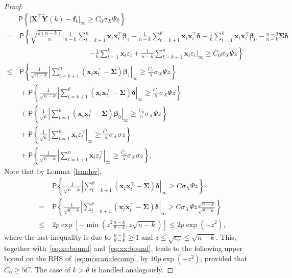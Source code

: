 \documentclass[11pt, a4paper]{article}
\newcommand{\mbf}{\mathbf}
\newcommand{\eps}{\epsilon}
\newcommand{\vep}{\varepsilon}
\renewcommand{\l}{\left}
\renewcommand{\r}{\right}
\def\wt{\widetilde}
\newcommand{\cp}{\theta}
\newcommand{\p}{\mathsf{P}}
\newcommand{\nn}{\nonumber}
\theoremstyle{definition}
\theoremstyle{definition}
\theoremstyle{definition}
\theoremstyle{definition}
\theoremstyle{definition}
\theoremstyle{remark}
\theoremstyle{definition}
\theoremstyle{definition}
\theoremstyle{definition}
\begin{document}
\begin{proof}
\begin{align}
& \p\l\{ \vert \mbf X^\top \wt{\mbf Y}(k) - \bar{\mbf f}_k \vert_\infty \ge \bar{C}_0 \sigma_X \Psi z \r\}
\nn \\
= & \, \p\l\{ \sqrt{\frac{k(n - k)}{n}} \Biggl\vert \frac{1}{n - k} \sum_{t = k + 1}^n \mbf x_t \mbf x_t^\top \bm\beta_1  - \frac{1}{n - k} \sum_{t = k + 1}^{\cp} \mbf x_t \mbf x_t^\top \bm\delta - \frac{1}{k} \sum_{t = 1}^k \mbf x_t \mbf x_t^\top \bm\beta_0 - \frac{n - \cp}{n - k} \bm\Sigma \bm\delta \r.
\nn \\
& \qquad \qquad \qquad \qquad \qquad \l. - \frac{1}{k} \sum_{t = 1}^k \mbf x_t \vep_t + \frac{1}{n - k} \sum_{t = k + 1}^n \mbf x_t \vep_t \Biggr\vert_\infty  \ge \bar{C}_0 \sigma_X \Psi z \r\}
\nn \\
\le & \, \p\l\{ \frac{1}{\sqrt{n - k}} \l\vert \sum_{t = k + 1}^n (\mbf x_t \mbf x_t^\top - \bm\Sigma) \bm\beta_1 \r\vert_\infty \ge \frac{\bar{C}_0}{5} \sigma_X \Psi z \r\}
\nn \\
& \, + \p\l\{ \frac{1}{\sqrt{n - k}} \l\vert \sum_{t = k + 1}^\cp (\mbf x_t \mbf x_t^\top - \bm\Sigma) \bm\delta \r\vert_\infty \ge \frac{\bar{C}_0}{5} \sigma_X \Psi z \r\}
\nn \\
& \, + \p\l\{ \frac{1}{\sqrt{k}} \l\vert \sum_{t = 1}^k (\mbf x_t \mbf x_t^\top - \bm\Sigma) \bm\beta_0 \r\vert_\infty \ge \frac{\bar{C}_0}{5} \sigma_X \Psi z \r\}
\nn \\
& \, + \p\l\{ \frac{1}{\sqrt{k}} \l\vert \sum_{t = 1}^k \mbf x_t \vep_t^\top \r\vert_\infty \ge \frac{\bar{C}_0}{5} \sigma_X \sigma z \r\} 
\nn \\
& \, + \p\l\{ \frac{1}{\sqrt{n - k}} \l\vert \sum_{t = k + 1}^n \mbf x_t \vep_t^\top \r\vert_\infty \ge \frac{\bar{C}_0}{5} \sigma_X \sigma z \r\}.
\label{eq:mcscan:decomp}
\end{align}
Note that by Lemma~\ref{lem:hw},
\begin{align*}
& \p\l\{ \frac{1}{\sqrt{n - k}} \l\vert \sum_{t = k + 1}^\cp (\mbf x_t \mbf x_t^\top - \bm\Sigma) \bm\delta \r\vert_\infty \ge C \sigma_X \Psi  z \r\} \\
= \; &  \p\l\{ \frac{1}{\sqrt{\cp - k}} \l\vert \sum_{t = k + 1}^\cp (\mbf x_t \mbf x_t^\top - \bm\Sigma) \bm\delta \r\vert_\infty \ge C \sigma_X \Psi z  \frac{\sqrt{n - k}}{\sqrt{\cp - k}} \r\} \\
\le \; & 2p \exp\l[-\min\l( z^2\frac{n-k}{\cp-k}, z\sqrt{n-k} \r) \r]  \le 2p\exp(-z^2),
\end{align*}
where the last inequality is due to $\tfrac{n-k}{\cp-k} \ge 1$ and $z \le \sqrt{\eps_n} \le \sqrt{n-k}$.
This, together with~\eqref{eq:xe:bound} and~\eqref{eq:xx:bound}, leads to the following upper bound on the RHS of~\eqref{eq:mcscan:decomp}, by $10 p \exp( - z^2)$, provided that $\bar{C}_0 \ge 5C$. The case of $k > \cp$ is handled analogously.
\end{proof}
\end{document}
